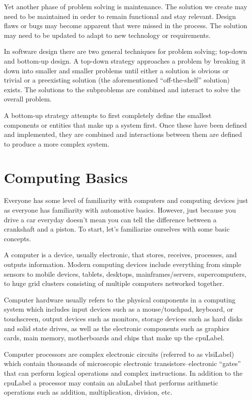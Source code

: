 Yet another phase of problem solving is maintenance.  The solution
we create may need to be maintained in order to remain functional
and stay relevant.  Design flaws or bugs may become apparent that
were missed in the process.  The solution may need to be updated
to adapt to new technology or requirements.  

In software design there are two general techniques for problem solving;
top-down and bottom-up design.  A top-down strategy approaches a problem
by breaking it down into smaller and smaller problems until either a solution
is obvious or trivial or a preexisting solution (the aforementioned ``off-the-shelf'' 
solution) exists.  The solutions to the subproblems are combined and
interact to solve the overall problem.

A bottom-up strategy attempts to first completely define the smallest
components or entities that make up a system first.  Once these have
been defined and implemented, they are combined and interactions
between them are defined to produce a more complex system.

\section{Computing Basics}

Everyone has some level of familiarity with computers and computing 
devices just as everyone has familiarity with automotive basics.  However, 
just because you drive a car everyday doesn't mean you can tell the 
difference between a crankshaft and a piston.  To start, let's familiarize
ourselves with some basic concepts.

A computer is a device, usually electronic, that stores, receives, 
processes, and outputs information.  Modern computing devices include
everything from simple sensors to mobile devices, tablets, desktops, 
mainframes/servers, supercomputers, to huge grid clusters consisting
of multiple computers networked together.

Computer hardware usually refers to the physical components in a 
computing system which includes input devices such as a mouse/touchpad, 
keyboard, or touchscreen, output devices such as monitors, storage 
devices such as hard disks and solid state drives, as well as the
electronic components such as graphics cards, main memory, motherboards and
chips that make up the \gls{cpuLabel}.

Computer processors are complex electronic circuits (referred to as
\gls{vlsiLabel}) which contain thousands of 
microscopic electronic transistors--electronic ``gates'' that can perform
logical operations and complex instructions.  In addition to the \gls{cpuLabel}
a processor may contain an \gls{aluLabel} that performs arithmetic 
operations such as addition, multiplication, division, etc.

